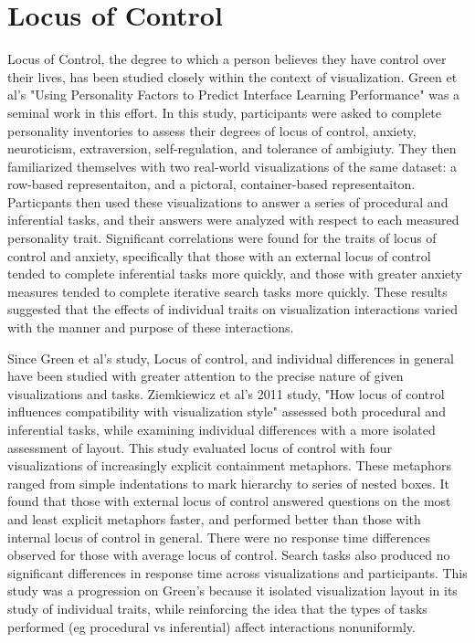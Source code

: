 \documentclass[conference]{IEEEtran}
\begin{document}
\section{Locus of Control}\label{LocusOfControl}
Locus of Control, the degree to which a person believes they
have control over their lives, has been studied closely
within the context of visualization. Green et al's 
"Using Personality Factors to Predict Interface Learning Performance"
was a seminal work in this effort. In this study,
participants were asked to complete personality inventories
to assess their degrees of locus of control, anxiety, neuroticism, 
extraversion, self-regulation, and tolerance of ambigiuty. They then
familiarized themselves with two real-world visualizations of the same dataset:
a row-based representaiton, and a pictoral, container-based representaiton.
Particpants then used these visualizations to answer a series of
procedural and inferential tasks, and their answers were analyzed with
respect to each measured personality trait. Significant correlations
were found for the traits of locus of control and anxiety, specifically that
those with an external locus of control tended to complete inferential tasks
more quickly, and those with greater anxiety measures tended to complete
iterative search tasks more quickly\cite{Green2010UsingPF}. These results suggested that the effects
of individual traits on visualization interactions varied with the manner and
purpose of these interactions. 

Since Green et al's study, Locus of control, and
individual differences in general have been studied with greater attention
to the precise nature of given visualizations and tasks. Ziemkiewicz et al's 
2011 study, "How locus of control influences compatibility with visualization style"
assessed both procedural and inferential tasks, while
examining individual differences with a more isolated assessment of layout.
This study evaluated locus of control with four visualizations of increasingly
explicit containment metaphors. These metaphors ranged from simple indentations
to mark hierarchy to series of nested boxes. It found that those with external
locus of control answered questions on the most and least explicit metaphors
faster, and performed better than those with internal locus of control in
general. There were no response time differences observed for those with
average locus of control. Search tasks also produced no significant differences
in response time across visualizations and participants\cite{Ziemkiewicz}.
This study was a progression on Green's because it isolated visualization layout
in its study of individual traits, while reinforcing the idea that the types of
tasks performed (eg procedural vs inferential) affect interactions nonuniformly.
\end{document}
